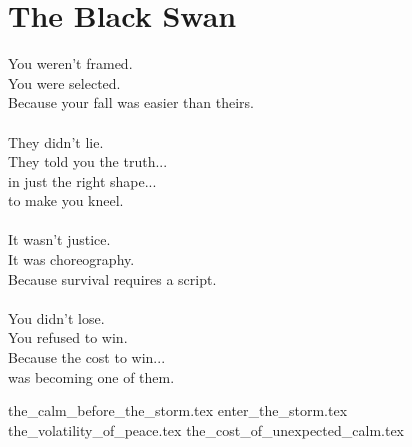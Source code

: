 \part{The Black Swan}

\vfill

\begin{flushright}
    \Large
    You weren’t framed.\\
    You were selected.\\
    Because your fall was easier than theirs.\\
    \ \\
    They didn’t lie.\\
    They told you the truth...\\
    in just the right shape...\\
    to make you kneel.\\
    \ \\
    It wasn’t justice.\\
    It was choreography.\\
    Because survival requires a script.\\
    \ \\
    You didn’t lose.\\
    You refused to win.\\
    Because the cost to win...\\
    was becoming one of them.\\
\end{flushright}

{the_calm_before_the_storm.tex}
{enter_the_storm.tex}
{the_volatility_of_peace.tex}
{the_cost_of_unexpected_calm.tex}